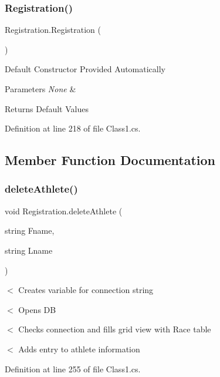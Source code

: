 \subsubsection{\texorpdfstring{Registration()}{Registration()}}
{\footnotesize\ttfamily Registration.\+Registration (\begin{DoxyParamCaption}{ }\end{DoxyParamCaption})\hspace{0.3cm}{\ttfamily [inline]}}

Default Constructor Provided Automatically 
\begin{DoxyParams}{Parameters}
{\em None} & \\
\hline
\end{DoxyParams}
\begin{DoxyReturn}{Returns}
Default Values 
\end{DoxyReturn}


Definition at line 218 of file Class1.\+cs.



\subsection{Member Function Documentation}
\mbox{\label{classRegistration_ab8effd4c7b67d1e767530a2534d8b354}} 
\subsubsection{\texorpdfstring{delete\+Athlete()}{deleteAthlete()}}
{\footnotesize\ttfamily void Registration.\+delete\+Athlete (\begin{DoxyParamCaption}\item[{string}]{Fname,  }\item[{string}]{Lname }\end{DoxyParamCaption})\hspace{0.3cm}{\ttfamily [inline]}}

$<$ Creates variable for connection string

$<$ Opens DB

$<$ Checks connection and fills grid view with Race table

$<$ Adds entry to athlete information 

Definition at line 255 of file Class1.\+cs.

